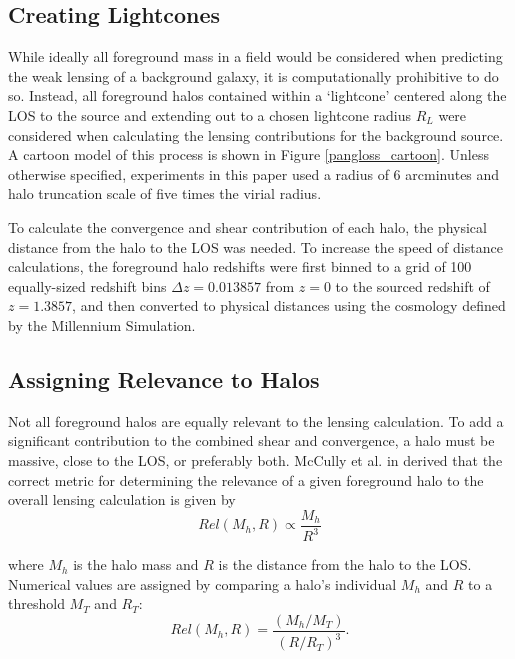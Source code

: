 \documentclass[%
 reprint,
 amsmath,amssymb,
 aps,nofootinbib
]{revtex4-1}
\begin{document}
\subsection{Creating Lightcones}

While ideally all foreground mass in a field would be considered when predicting the weak lensing of a background galaxy, it is computationally prohibitive to do so. Instead, all foreground halos contained within a `lightcone' centered along the LOS to the source and extending out to a chosen lightcone radius $R_L$ were considered when calculating the lensing contributions for the background source. A cartoon model of this process is shown in Figure \ref{pangloss_cartoon}. Unless otherwise specified, experiments in this paper used a radius of 6 arcminutes and halo truncation scale of five times the virial radius.

To calculate the convergence and shear contribution of each halo, the physical distance from the halo to the LOS was needed. To increase the speed of distance calculations, the foreground halo redshifts were first binned to a grid of 100 equally-sized redshift bins $\Delta z=0.013857$ from $z=0$ to the sourced redshift of $z=1.3857$, and then converted to physical distances using the cosmology defined by the Millennium Simulation.

\subsection{Assigning Relevance to Halos}

Not all foreground halos are equally relevant to the lensing calculation. To add a significant contribution to the combined shear and convergence, a halo must be massive, close to the LOS, or preferably both. McCully et al. in \cite{mccully} derived that the correct metric for determining the relevance of a given foreground halo to the overall lensing calculation is given by
\begin{equation}\label{relevant}
Rel(M_h,R)\propto\frac{M_h}{R^3}
\end{equation}

\noindent where $M_h$ is the halo mass and $R$ is the distance from the halo to the LOS. Numerical values are assigned by comparing a halo's individual $M_h$ and $R$ to a threshold $M_T$ and $R_T$:
\begin{equation}\label{relevant_thresh}
Rel(M_h,R)=\frac{(M_h/M_T)}{(R/R_T)^3}.
\end{equation}
\end{document}
